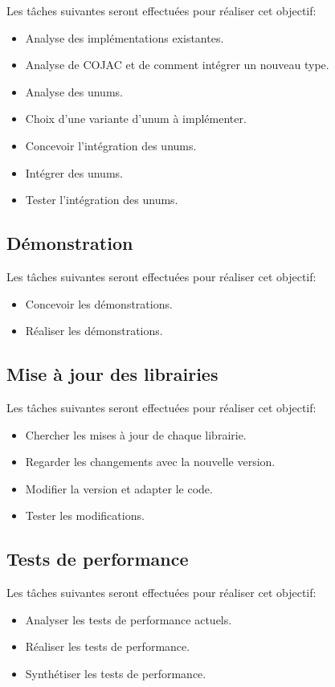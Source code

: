 Les tâches suivantes seront effectuées pour réaliser cet objectif:
\begin{itemize}
    \item Analyse des implémentations existantes.
    \item Analyse de COJAC et de comment intégrer un nouveau type.
    \item Analyse des unums.
    \item Choix d'une variante d'unum à implémenter.
    \item Concevoir l'intégration des unums.
    \item Intégrer des unums.
    \item Tester l'intégration des unums.
\end{itemize}

\subsection{Démonstration}

Les tâches suivantes seront effectuées pour réaliser cet objectif:
\begin{itemize}
    \item Concevoir les démonstrations.
    \item Réaliser les démonstrations.
\end{itemize}

\subsection{Mise à jour des librairies}

Les tâches suivantes seront effectuées pour réaliser cet objectif:
\begin{itemize}
    \item Chercher les mises à jour de chaque librairie.
    \item Regarder les changements avec la nouvelle version.
    \item Modifier la version et adapter le code.
    \item Tester les modifications.
\end{itemize}

\subsection{Tests de performance}

Les tâches suivantes seront effectuées pour réaliser cet objectif:
\begin{itemize}
    \item Analyser les tests de performance actuels.
    \item Réaliser les tests de performance.
    \item Synthétiser les tests de performance.
\end{itemize}

